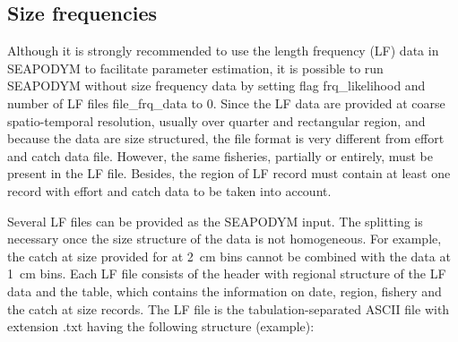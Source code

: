 \subsection{Size frequencies}\label{sec:LF-datafile}
Although it is strongly recommended to use the length frequency (LF) data in SEAPODYM to facilitate parameter estimation, it is possible to run SEAPODYM without size frequency data by setting flag {\ttfamily frq\_likelihood} and number of LF files {\ttfamily file\_frq\_data} to 0. Since the LF data are provided at coarse spatio-temporal resolution, usually over quarter and rectangular region, and because the data are size structured, the file format is very different from effort and catch data file. However, the same fisheries, partially or entirely, must be present in the LF file. Besides, the region of LF record must contain at least one record with effort and catch data to be taken into account. 

Several LF files can be provided as the SEAPODYM input. The splitting is necessary once the size structure of the data is not homogeneous. For example, the catch at size provided for at 2~cm bins cannot be combined with the data at 1~cm bins. Each LF file consists of the header with regional structure of the LF data and the table, which contains the information on date, region, fishery and the catch at size records. The LF file is the tabulation-separated ASCII  file with extension .txt having the following structure (example):

